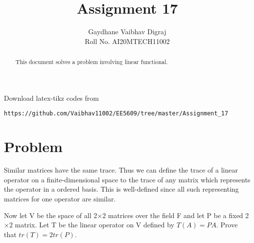 \documentclass[journal,12pt,twocolumn]{IEEEtran}
\begin{document}
     \def\rightbox#1{\makebox[0in][r]{#1}}
     \def\centbox#1{\makebox[0in]{#1}}
     \def\topbox#1{\raisebox{-\baselineskip}[0in][0in]{#1}}
     \def\midbox#1{\raisebox{-0.5\baselineskip}[0in][0in]{#1}}
\vspace{3cm}
\title{Assignment 17}
\author{Gaydhane Vaibhav Digraj \\ Roll No. AI20MTECH11002}
\maketitle
\newpage
\bigskip
\renewcommand{\thefigure}{\theenumi}
\renewcommand{\thetable}{\theenumi}
\begin{abstract}
This document solves a problem involving linear functional.
\end{abstract}
%
Download latex-tikz codes from 
%
\begin{lstlisting}
https://github.com/Vaibhav11002/EE5609/tree/master/Assignment_17
\end{lstlisting}
%
\section{Problem}
Similar matrices have the same trace. Thus we can define the trace of a linear operator on a finite-dimensional space to the trace of any matrix which represents the operator in a ordered basis. This is well-defined since all such representing matrices for one operator are similar. 

Now let V be the space of all 2$\times$2 matrices over the field F and let P be a fixed 2$\times$2 matrix. Let T be the linear operator on V defined by $T(A)=PA$. Prove that $tr(T)=2tr(P)$. 
\end{document}
